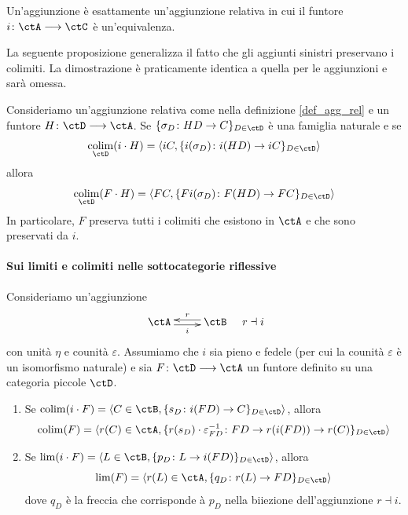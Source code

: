 \begin{remark}\label{oss_agg_rel_agg}
 Un'aggiunzione è esattamente un'aggiunzione relativa in cui il funtore \(i \colon \ctA \fun \ctC\) è un'equivalenza.
\end{remark}

La seguente proposizione generalizza il fatto che gli aggiunti sinistri preservano i colimiti. La dimostrazione è praticamente
identica a quella per le aggiunzioni e sarà omessa.

\begin{proposition}\label{prop_preserv_agg_rel}
 Consideriamo un'aggiunzione relativa come nella definizione \ref{def_agg_rel} e un funtore \(H \colon \ctD \fun \ctA\).
 Se \(\{\sigma_D \colon HD \to C\}_{D \in \ctD}\) è una famiglia naturale e se
 \[ \colim_{\ctD}(i \cmp H) = \langle iC, \{i(\sigma_D) \colon i(HD) \to iC\}_{D \in \ctD}\rangle \]
 allora
 \[ \colim_{\ctD}(F \cmp H) = \langle FC, \{Fi(\sigma_D) \colon F(HD) \to FC\}_{D \in \ctD}\rangle \]
 In particolare, \(F\) preserva tutti i colimiti che esistono in \(\ctA\) e che sono preservati da \(i\).
\end{proposition}

\paragraph{Sui limiti e colimiti nelle sottocategorie riflessive}\label{sec_sottocat_rifl}

\begin{proposition}\label{prop_(co)lim_sottocat_rifl}
 Consideriamo un'aggiunzione
 \[\xymatrix{\ctA \ar@<-0.5ex>[r]_-{i} & \ctB \ar@<-0.5ex>[l]_{r}} \;\;\;\; r \dashv i\]
 con unità \(\eta\) e counità \(\varepsilon\). Assumiamo che \(i\) sia pieno e fedele (per cui la counità
 \(\varepsilon\) è un isomorfismo naturale) e sia \(F \colon \ctD \fun \ctA\) un funtore definito su una categoria piccole \(\ctD\).
 \begin{enumerate}
  \item Se \(\colim(i \cdot F) = \langle C \in \ctB, \{s_D \colon i(FD) \to C\}_{D \in \ctD}\rangle\), allora
        \[\colim(F) = \langle r(C) \in \ctA,\{r(s_D) \cdot \varepsilon_{FD}^{-1} \colon FD \to r(i(FD)) \to r(C)\}_{D \in \ctD}\rangle\]
  \item Se \(\lim(i \cdot F) = \langle L \in \ctB, \{p_D \colon L \to i(FD)\}_{D \in \ctD}\rangle\), allora
        \[\lim(F) = \langle r(L) \in \ctA, \{q_D \colon r(L) \to FD\}_{D \in \ctD}\rangle\]
        dove \(q_D\) è la freccia che corrisponde à \(p_D\) nella biiezione dell'aggiunzione \(r \dashv i\).
 \end{enumerate}
\end{proposition}

